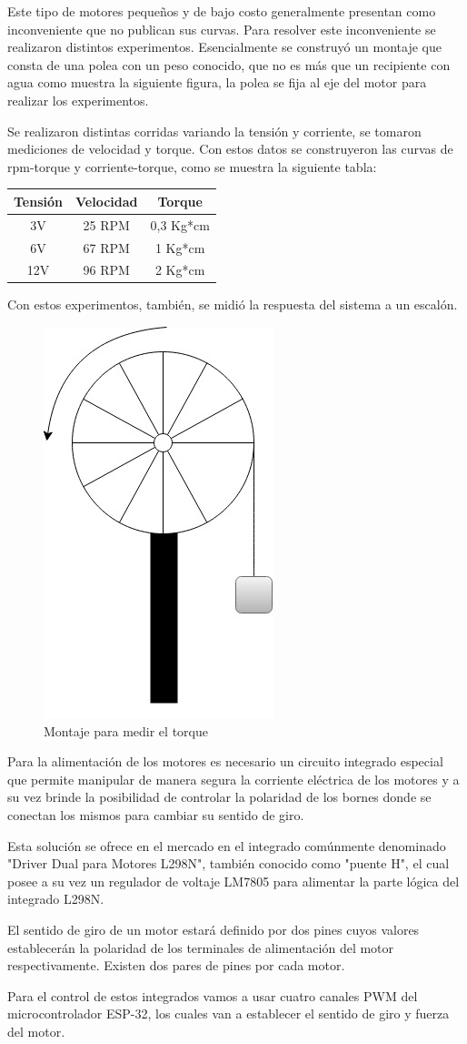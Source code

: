Este tipo de motores pequeños y de bajo costo generalmente presentan como inconveniente que no publican sus curvas. Para resolver este inconveniente se realizaron distintos experimentos. Esencialmente se construyó un montaje que consta de una polea con un peso conocido, que no es más que un recipiente con agua como muestra la siguiente figura, la polea se fija al eje del motor para realizar los experimentos.

Se realizaron distintas corridas variando la tensión y corriente, se tomaron mediciones de velocidad y torque. Con estos datos se construyeron las curvas de rpm-torque y corriente-torque, como se muestra la siguiente tabla:

\begin{center} \begin{tabular}{|c|c|c|}
   \hline
       Tensión & Velocidad & Torque \\
   \hline
       3V & 25 RPM & 0,3 Kg*cm\\
   \hline
       6V & 67 RPM & 1 Kg*cm\\
   \hline
       12V & 96 RPM & 2 Kg*cm\\
   \hline
\end{tabular} \end{center}

Con estos experimentos, también, se midió la respuesta del sistema a un escalón.

\begin{figure}[H]
    \centering
    \includegraphics[width=0.25\linewidth]{images/medicion_rpm.jpg}
    \caption{Montaje para medir el torque}
    \label{fig:medicion_torque}
\end{figure}

Para la alimentación de los motores es necesario un circuito integrado especial que permite manipular de manera segura la corriente eléctrica de los motores y a su vez brinde la posibilidad de controlar la polaridad de los bornes donde se conectan los mismos para cambiar su sentido de giro.

Esta solución se ofrece en el mercado en el integrado comúnmente denominado "Driver Dual para Motores L298N", también conocido como "puente H", el cual posee a su vez un regulador de voltaje LM7805 para alimentar la parte lógica del integrado L298N.

El sentido de giro de un motor estará definido por dos pines cuyos valores establecerán la polaridad de los terminales de alimentación del motor respectivamente. Existen dos pares de pines por cada motor.

Para el control de estos integrados vamos a usar cuatro canales PWM del microcontrolador ESP-32, los cuales van a establecer el sentido de giro y fuerza del motor.